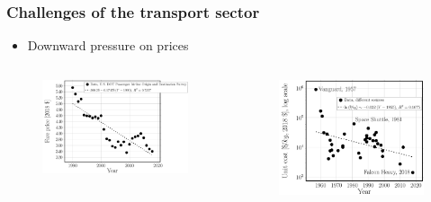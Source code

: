 \documentclass[first,firstsupp,lastsupp,last,hyperref,table]{ETHclass}
\begin{document}
\addtocounter{framenumber}{-1}

\begin{frame}
\frametitle{Challenges of the transport sector}
\vspace{-0.5cm}
\centering
\begin{itemize}[label=]
\item Downward pressure on prices
\end{itemize}
\begin{columns}[c]
\begin{column}{0.55\textwidth}
\centering
\begin{figure}
\centering
\includegraphics[width=\columnwidth]{airlinefarecost.pdf}
\end{figure}
\end{column}
\begin{column}{0.45\textwidth}
\centering
\begin{figure}
\centering
\includegraphics[width=\columnwidth]{spacetravelcost.pdf}
\end{figure}
\end{column}
\end{columns}
\end{frame}
\end{document}

